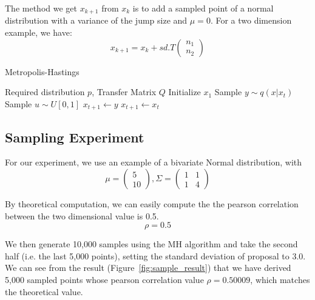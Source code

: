 The method we get $x_{k+1}$ from $x_{k}$ is to add a sampled point of a normal distribution with a variance of the jump size and $\mu=0$. For a two dimension example, we have:
\begin{equation}
x_{k+1} = x_{k} + sd.T \left( \begin{array}{ccc}
n_{1} \\
n_{2} \end{array} \right) 
\end{equation}

	\begin{algorithm}
        \caption{Metropolis-Hastings}
        \begin{algorithmic}
        	\Require Required distribution $p$, Transfer Matrix $Q$
        	\State Initialize $x_{1}$ 
                \State Sample $y \sim q(x|x_{t})$
	            \State Sample $u \sim U{[0,1]}$
	                \State $x_{t+1} \gets y$
	            \Else
	            	\State $x_{t+1} \gets x_{t}$
	            \EndIf
			\EndFor
        \end{algorithmic}
    \end{algorithm}




\subsection{Sampling Experiment}
For our experiment, we use an example of a bivariate Normal distribution, with
$$ \mu = \left( \begin{array}{ccc}
5 \\
10 \end{array} \right), 
\Sigma = \left( \begin{array}{ccc}
1 & 1\\
1 & 4\end{array} \right)$$

By theoretical computation, we can easily compute the the pearson correlation between the two dimensional value is 0.5.
$$ \rho = 0.5 $$

We then generate 10,000 samples using the MH algorithm and take the second half (i.e. the last 5,000 points), setting the standard deviation of proposal to 3.0. We can see from the result (Figure~\ref{fig:sample_result}) that we have derived 5,000 sampled points whose pearson correlation value $\rho=0.50009$, which matches the theoretical value.

